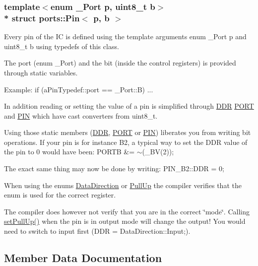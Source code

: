 \subsubsection*{template$<$enum \+\_\+\+Port p, uint8\+\_\+t b$>$\\*
struct ports\+::\+Pin$<$ p, b $>$}

Every pin of the IC is defined using the template arguments {\ttfamily enum \+\_\+\+Port p} and {\ttfamily uint8\+\_\+t b} using {\ttfamily typedef}s of this class. 

The port (enum \+\_\+\+Port) and the bit (inside the control registers) is provided through static variables.

Example\+: {\ttfamily if (a\+Pin\+Typedef\+::port == \+\_\+\+Port\+::B) ...}

In addition reading or setting the value of a pin is simplified through \hyperlink{structports_1_1Pin_aaebb4d6cb5db0635fe8e7d6e7d315c7f}{D\+DR} \hyperlink{structports_1_1Pin_aaa08f0eb17ef31d9f46d65d50c8a093e}{P\+O\+RT} and \hyperlink{structports_1_1Pin_ae2e45a41082457c350f71f7a720265d4}{P\+IN} which have cast converters from uint8\+\_\+t.

Using those static members (\hyperlink{structports_1_1Pin_aaebb4d6cb5db0635fe8e7d6e7d315c7f}{D\+DR}, \hyperlink{structports_1_1Pin_aaa08f0eb17ef31d9f46d65d50c8a093e}{P\+O\+RT} or \hyperlink{structports_1_1Pin_ae2e45a41082457c350f71f7a720265d4}{P\+IN}) liberates you from writing bit operations. If your pin is for instance B2, a typical way to set the D\+DR value of the pin to 0 would have been\+: {\ttfamily P\+O\+R\+TB \&= $\sim$(\+\_\+\+B\+V(2));}

The exact same thing may now be done by writing\+: {\ttfamily P\+I\+N\+\_\+\+B2\+::\+D\+DR = 0;}

When using the enums \hyperlink{namespaceports_a46987e78fa447129742fadda5eccafb4}{Data\+Direction} or \hyperlink{namespaceports_a49bf0ccedb4cfed89a328574e53bec07}{Pull\+Up} the compiler verifies that the enum is used for the correct register.

The compiler does however not verify that you are in the correct \char`\"{}mode\char`\"{}. Calling \hyperlink{structports_1_1Pin_a11ba9e7aeda2d867780dee32234f2c7e}{set\+Pull\+Up()} when the pin is in output mode will change the output! You would need to switch to input first ({\ttfamily D\+DR = Data\+Direction\+::\+Input;}). 

\subsection{Member Data Documentation}
